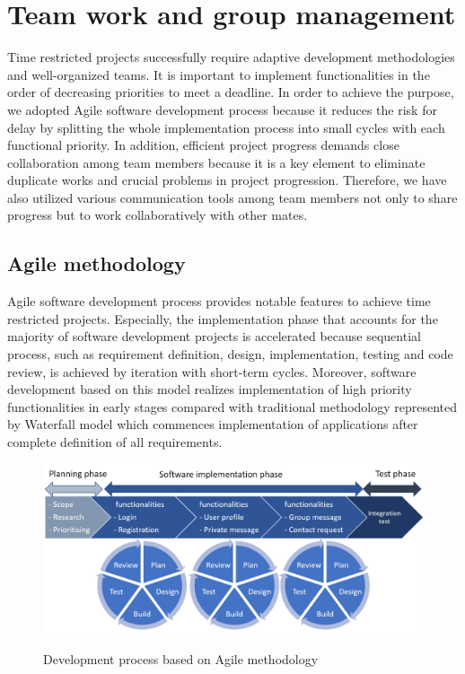 \documentclass{article}
\begin{document}
\section{Team work and group management}

Time restricted projects successfully require adaptive development methodologies and well-organized teams. It is important to implement functionalities in the order of decreasing priorities to meet a deadline. In order to achieve the purpose, we adopted Agile software development process because it reduces the risk for delay by splitting the whole implementation process into small cycles with each functional priority. In addition, efficient project progress demands close collaboration among team members because it is a key element to eliminate duplicate works and crucial problems in project progression. Therefore, we have also utilized various communication tools among team members not only to share progress but to work collaboratively with other mates.        
\subsection{Agile methodology}
Agile software development process provides notable features to achieve time restricted projects. Especially, the implementation phase that accounts for the majority of software development projects is accelerated because sequential process, such as requirement definition, design,  implementation, testing and code review, is achieved by iteration with short-term cycles. Moreover, software development based on this model realizes implementation of high priority functionalities in early stages compared with traditional methodology represented by Waterfall model which commences implementation of applications after complete definition of all requirements.\\      

\begin{figure}[h]
\centering
\includegraphics[scale=0.3]{agile.png}
\cite{agile}
\caption{Development process based on Agile methodology}
\label{fig:agile}
\end{figure}
\end{document}
